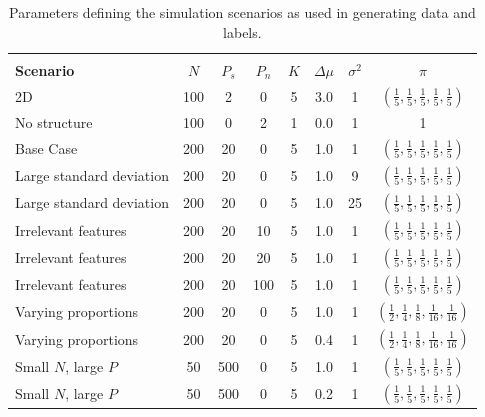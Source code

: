 \documentclass[]{article}
\begin{document}
\begin{table}[ht]
	\centering
	\begin{tabular}{l|ccccccc}
		\\[-1.8ex]\hline 
		\hline \\[-1.8ex] 
	\textbf{Scenario} & $N$ & $P_s$ & $P_n$ & $K$ & $\Delta\mu$ & $\sigma^2$ & $\pi$\\
	\hline 
	2D & 100 & 2 & 0 & 5 & 3.0 & 1 &  $(\frac{1}{5} , \frac{1}{5}, \frac{1}{5}, \frac{1}{5}, \frac{1}{5})$ \\
	No structure & 100 & 0 & 2 & 1 & 0.0 & 1 & 1 \\
	Base Case & 200 & 20 & 0 & 5 & 1.0 & 1 &  $(\frac{1}{5} , \frac{1}{5}, \frac{1}{5}, \frac{1}{5}, \frac{1}{5})$\\
	Large standard deviation & 200 & 20 & 0 & 5 & 1.0 & 9 & $(\frac{1}{5} , \frac{1}{5}, \frac{1}{5}, \frac{1}{5}, \frac{1}{5})$ \\
	Large standard deviation & 200 & 20 & 0 & 5 & 1.0 & 25 &  $(\frac{1}{5} , \frac{1}{5}, \frac{1}{5}, \frac{1}{5}, \frac{1}{5})$\\
	Irrelevant features & 200 & 20 & 10 & 5 & 1.0 & 1 &  $(\frac{1}{5} , \frac{1}{5}, \frac{1}{5}, \frac{1}{5}, \frac{1}{5})$\\
	Irrelevant features & 200 & 20 & 20 & 5 & 1.0 & 1 &  $(\frac{1}{5} , \frac{1}{5}, \frac{1}{5}, \frac{1}{5}, \frac{1}{5})$\\
	Irrelevant features & 200 & 20 & 100 & 5 & 1.0 & 1 &  $(\frac{1}{5} , \frac{1}{5}, \frac{1}{5}, \frac{1}{5}, \frac{1}{5})$\\
	Varying proportions & 200 & 20 & 0 & 5 & 1.0 & 1 & $(\frac{1}{2} , \frac{1}{4}, \frac{1}{8}, \frac{1}{16}, \frac{1}{16})$ \\
	Varying proportions & 200 & 20 & 0 & 5 & 0.4 & 1 &  $(\frac{1}{2} , \frac{1}{4}, \frac{1}{8}, \frac{1}{16}, \frac{1}{16})$ \\ %
	Small $N$, large $P$ & 50 & 500 & 0 & 5 & 1.0 & 1 &  $(\frac{1}{5} , \frac{1}{5}, \frac{1}{5}, \frac{1}{5}, \frac{1}{5})$\\
	Small $N$, large $P$ & 50 & 500 & 0 & 5 & 0.2 & 1 &  $(\frac{1}{5} , \frac{1}{5}, \frac{1}{5}, \frac{1}{5}, \frac{1}{5})$
	\\
	\hline
	\end{tabular}
	\caption{Parameters defining the simulation scenarios as used in generating data and labels.}
	\label{table:scenarioTable}
\end{table}%
\end{document}
